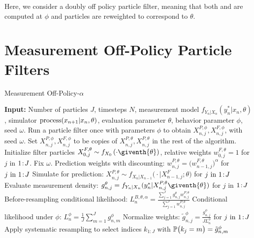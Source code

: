 \documentclass{article}
\begin{document}
Here, we consider a doubly off policy particle filter, meaning that both  and  are computed at $\phi$ and particles are reweighted to correspond to $\theta$.

\section{Measurement Off-Policy Particle Filters}

\begin{algorithm}[H]
\centering
	\caption{Measurement Off-Policy-$\alpha$}
    \label{alg:mop}
	\begin{algorithmic}[1]
	     \STATE \textbf{Input:} Number of particles $J$, timesteps $N$, measurement model $f_{Y_n|X_n}(y_n^*|x_n, \theta)$, simulator $\text{process}(x_{n+1}|x_n, \theta)$, evaluation parameter $\theta$, behavior parameter $\phi$, seed $\omega$.
        \IF{$\theta \neq \phi$}
            \STATE Run a particle filter once with parameters $\phi$ to obtain $X_{n,j}^{P,\phi}, X_{n,j}^{F,\phi}$, with seed $\omega$.
        \ELSE
        \STATE Set $X_{n,j}^{P,\phi}, X_{n,j}^{F,\phi}$ to be copies of $X_{n,j}^{P,\theta}, X_{n,j}^{P,\theta}$ in the rest of the algorithm.
        \ENDIF
		\STATE Initialize filter particles ${X}_{0,j}^{F,\theta}\sim {f}_{{X}_{0}}\left(\cdot\giventh{\theta}\right)$, relative weights $w^{F,\theta}_{0,j}= 1$ for $j$ in ${1}\!:\!{J}$. Fix $\omega.$
            \STATE Prediction weights with discounting: $w_{n,j}^{P,\theta} = \big(w_{n-1,j}^{F,\theta}\big)^\alpha$ for $j\ \mathrm{in}\ {1}\!:\!{J}$
            \label{mop-alpha:discount}
            \STATE Simulate for prediction:
            ${X}_{n,j}^{P,\theta}\sim {f}_{{X}_{n}|{X}_{n-1}}\big(\cdot|{X}_{n-1,j}^{F};{\theta}\big)$ for $j\ \mathrm{in}\ {1}\!:\!{J}$ \label{mop-alpha:step1}
            \STATE Evaluate measurement density:
            $g^{\theta}_{n,j}={f}_{{Y}_{n}|{X}_{n}}(y_{n}^{*}|{X}_{n,j}^{P,\theta}\giventh{\theta})$ for $j$ in ${1}\!:\!{J}$
            \STATE Before-resampling conditional likelihood: $\displaystyle L_n^{B,\theta,\alpha} = \frac{\sum_{j=1}^Jg^\theta_{n,j} w^{P,\theta}_{n,j}}{\sum_{j=1}^J  w^{P,\theta}_{n,j}}$
            \STATE Conditional likelihood under $\phi$: 
            $L_n^{\phi} = \frac{1}{J}\sum_{m=1}^{J}g^{\phi}_{n,m}$
            \label{dop-alpha:Lphi}
            \STATE Normalize weights:
            $\displaystyle \tilde{g}^{\phi}_{n,j}= \frac{g^{\phi}_{n,j}}{JL_n^{\phi}}$
            for $j\ \mathrm{in}\ {1}\!:\!{J}$
            \STATE Apply systematic resampling to select indices $k_{1:J}$ with $\mathbb{P}\big(k_{j}=m\big) =\tilde{g}^{\phi}_{n,m}$ \label{dop-alpha:systematic}

\end{algorithmic}
\end{algorithm}
\end{document}

